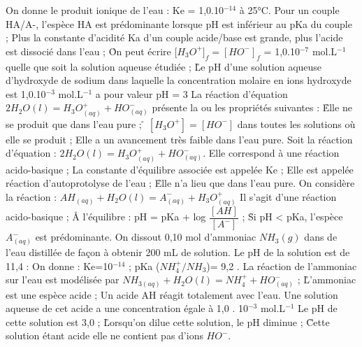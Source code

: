 \q	
On donne le produit ionique de l'eau : Ke = 1,0.10$^{-14}$ à 25°C.
\rv
Pour un couple HA/A-, l'espèce HA est prédominante lorsque pH est inférieur au pKa du couple ;
\rv
Plus la constante d'acidité Ka d'un couple acide/base est grande, plus l'acide est dissocié dans l'eau ;
\r
On peut écrire [$H_3O^+]_f = [HO^{-}]_f$ = 1,0.10$^{-7}$ mol.L$^{-1}$ quelle que soit la solution aqueuse étudiée ;
\r	
Le pH d'une solution aqueuse d'hydroxyde de sodium dans laquelle la concentration molaire en ions hydroxyde est 1,0.10$^{-3}$ mol.L$^{-1}$ a pour valeur pH = 3 
\q	
La réaction d'équation $2 H_2O(l) = H_3O^+_{(aq)}  + HO^{-}_{(aq)}$ présente la ou les propriétés suivantes :
\r
Elle ne se produit que dans l'eau pure ; 
\r
$[H_3O^+] = [HO^{-}]$  dans toutes les solutions où elle se produit ;
\rv
Elle a un avancement très faible dans l'eau pure.
 \q	
Soit la réaction d'équation :	$2 H_2O(l) = H_3O^+_{(aq)}  +  HO^{-}_{(aq)}.$
\rv
Elle correspond à une réaction acido-basique ;
\rv
La constante d'équilibre associée est appelée Ke ; 
\rv
Elle est appelée réaction d'autoprotolyse de l'eau ;
\r
Elle n'a lieu que dans l'eau pure.
   \q	On considère la réaction :	 $AH_{(aq)} + H_2O(l) = A^-_{(aq)} + H_3O^+_{(aq)}$
\rv
Il s'agit d'une réaction acido-basique ;
\r 	
A l'équilibre : pH = pKa + log $\dfrac{[AH]}{[A^-]}$  ;
\r
Si pH < pKa, l'espèce $A^-_{(aq)}$ est prédominante.
\q
On dissout 0,10 mol d'ammoniac $NH_3(g)$ dans de l'eau distillée de façon à obtenir 200 mL de solution.
Le pH de la solution est de 11,4 :
On donne :    Ke=10$^{-14}$ ;     pKa ($NH_4^+/NH_3$)=  9,2 .
\rv
La réaction de l'ammoniac sur l'eau est modélisée par $NH_{3(aq)} + H_2O(l) = NH_4^+ + HO^{-}_{(aq)}$ ;
\r
L'ammoniac est une espèce acide ;
\q	
Un acide AH réagit totalement avec l'eau. Une solution aqueuse de cet acide a une concentration égale à 1,0 . 10$^{-3}$ mol.L$^{-1}$ 
\rv
Le pH de cette solution est 3,0 ;
\r
Lorsqu'on dilue cette solution, le pH diminue ;
\r
Cette solution étant acide elle ne contient pas d'ions $HO^{-}$.

  
